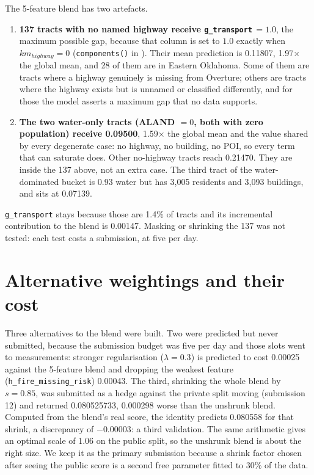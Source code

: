 \documentclass[a4paper]{article}
\newcommand{\Ftrans}{\texttt{g\_transport}}
\newcommand{\Ffire}{\texttt{h\_fire\_missing\_risk}}
\begin{document}
The 5-feature blend has two artefacts.

\begin{enumerate}
\item \textbf{137 tracts with no named highway receive \Ftrans$\,=1.0$}, the maximum possible
gap, because that column is set to $1.0$ exactly when $km_{highway}=0$
(\texttt{components()} in ). Their
mean prediction is \num{0.11807}, 1.97$\times$ the global mean, and 28 of them are in
Eastern Oklahoma. Some of them are tracts where a highway genuinely
is missing from Overture; others are tracts where the highway exists but is unnamed or
classified differently, and for those the model asserts a maximum gap that no data supports.
\item \textbf{The two water-only tracts (ALAND $=0$, both with zero population) receive
\num{0.09500}}, 1.59$\times$ the global mean and the value shared by every degenerate case: no
highway, no building, no POI, so every term that can saturate does. Other no-highway tracts reach
\num{0.21470}. They are inside the 137 above, not an extra case. The
third tract of the water-dominated bucket is 0.93 water but has 3{,}005 residents and
3{,}093 buildings, and sits at \num{0.07139}.
\end{enumerate}

\Ftrans{} stays because those are 1.4\% of tracts and its incremental contribution to the blend is
\num{0.00147}. Masking or shrinking the 137 was not tested: each test costs a submission, at five per day.

\section{Alternative weightings and their cost}
\label{sec:alt}

\begin{table}[htbp]
\centering
\caption{Alternative weightings. Mix4, the 5-feature blend and its $s=0.85$ shrink were
submitted; the others are predictions from the validated covariance identity.}
\label{tab:alt}
\footnotesize\setlength{\tabcolsep}{3pt}

\end{table}

Three alternatives to the blend were built. Two were predicted but never submitted, because
the submission budget was five per day and those slots went to measurements: stronger
regularisation ($\lambda=0.3$) is predicted to cost \num{0.00025} against the 5-feature blend and
dropping the weakest feature (\Ffire) \num{0.00043}. The third, shrinking the whole blend by $s=0.85$, was submitted
as a hedge against the private split moving (submission 12) and returned
\num{0.080525733}, \num{0.000298} worse than the unshrunk blend. Computed from the blend's real
score, the identity predicts \num{0.080558} for that shrink, a discrepancy of
$-\num{0.00003}$: a third validation. The same arithmetic gives an optimal scale of 1.06 on
the public split, so the unshrunk blend is about the right size. We keep it as the primary
submission because a shrink factor chosen after seeing the public score is a second free
parameter fitted to 30\% of the data.
\end{document}
